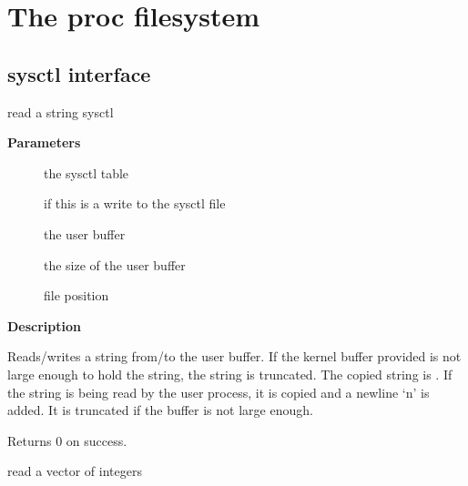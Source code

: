 \documentclass[a4paper,8pt,english]{sphinxmanual}
\begin{document}
\chapter{The proc filesystem}
\label{filesystems/index:the-proc-filesystem}

\section{sysctl interface}
\label{filesystems/index:sysctl-interface}

\begin{fulllineitems}
\label{filesystems/index:c.proc_dostring}
read a string sysctl

\end{fulllineitems}


\textbf{Parameters}
\begin{description}
\item[{}] \leavevmode
the sysctl table

\item[{}] \leavevmode
{} if this is a write to the sysctl file

\item[{}] \leavevmode
the user buffer

\item[{}] \leavevmode
the size of the user buffer

\item[{}] \leavevmode
file position

\end{description}

\textbf{Description}

Reads/writes a string from/to the user buffer. If the kernel
buffer provided is not large enough to hold the string, the
string is truncated. The copied string is .
If the string is being read by the user process, it is copied
and a newline `n' is added. It is truncated if the buffer is
not large enough.

Returns 0 on success.

\begin{fulllineitems}
\label{filesystems/index:c.proc_dointvec}
read a vector of integers

\end{fulllineitems}
\end{document}
